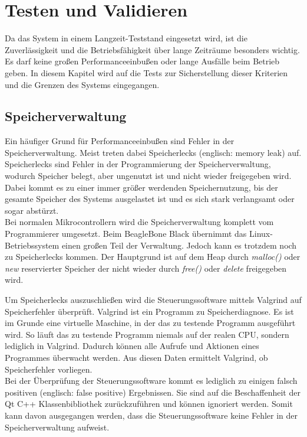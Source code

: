
\chapter{Testen und Validieren}
\label{chapter_Testen_und_Validieren}

Da das System in einem Langzeit-Teststand eingesetzt wird, ist die Zuverlässigkeit und die Betriebsfähigkeit über lange Zeiträume besonders wichtig. Es darf keine großen Performanceeinbußen oder lange Ausfälle beim Betrieb geben. In diesem Kapitel wird auf die Tests zur Sicherstellung dieser Kriterien und die Grenzen des Systems eingegangen.

\section{Speicherverwaltung}

Ein häufiger Grund für Performanceeinbußen sind Fehler in der Speicherverwaltung. Meist treten dabei Speicherlecks (englisch: memory leak) auf.  Speicherlecks sind Fehler in der Programmierung der Speicherverwaltung, wodurch Speicher belegt, aber ungenutzt ist und nicht wieder freigegeben wird. Dabei kommt es zu einer immer größer werdenden Speichernutzung, bis der gesamte Speicher des Systems ausgelastet ist und es sich stark verlangsamt oder sogar abstürzt.\\
Bei normalen Mikrocontrollern wird die Speicherverwaltung komplett vom Programmierer umgesetzt. Beim BeagleBone Black  übernimmt das Linux-Betriebssystem einen großen Teil der Verwaltung. Jedoch kann es trotzdem noch zu Speicherlecks kommen. Der Hauptgrund ist auf dem Heap durch \textit{malloc()} oder \textit{new} reservierter Speicher der nicht wieder durch \textit{free()} oder \textit{delete} freigegeben wird.\ 
  
Um Speicherlecks auszuschließen wird die Steuerungssoftware mittels Valgrind \cite{valgrind} auf Speicherfehler überprüft. Valgrind ist ein Programm zu Speicherdiagnose. Es ist im Grunde eine virtuelle Maschine, in der das zu testende Programm ausgeführt wird. So läuft das zu testende Programm niemals auf der realen CPU, sondern lediglich in Valgrind. Dadurch können alle Aufrufe und Aktionen eines Programmes überwacht werden. Aus diesen Daten ermittelt Valgrind, ob Speicherfehler vorliegen.\\
Bei der Überprüfung der Steuerungssoftware kommt es lediglich zu einigen falsch positiven (englisch: false positive) Ergebnissen. Sie sind auf die Beschaffenheit der Qt C++ Klassenbibliothek zurückzuführen und können ignoriert werden. Somit kann davon ausgegangen werden, dass die Steuerungssoftware keine Fehler in der Speicherverwaltung aufweist.\\

